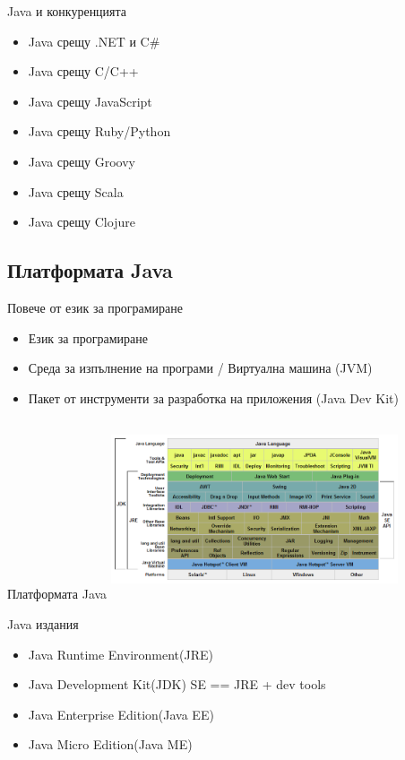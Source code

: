 \documentclass{beamer}
\begin{document}
\begin{frame}{Java и конкуренцията}
  \transdissolve
  \begin{itemize}
    \item Java срещу .NET и C\#
    \item Java срещу C/C++
    \item Java срещу JavaScript
    \item Java срещу Ruby/Python
    \item Java срещу Groovy
    \item Java срещу Scala
    \item Java срещу Clojure
  \end{itemize}
\end{frame}

\subsection{Платформата Java}

\begin{frame}{Повече от език за програмиране}
  \transdissolve
  \begin{itemize}
    \item Език за програмиране
    \item Среда за изпълнение на програми / Виртуална машина (JVM)
    \item Пакет от инструменти за разработка на приложения (Java Dev Kit)
  \end{itemize}

\end{frame}

\begin{frame}{Платформата Java}
  \transdissolve
  \includegraphics[height=200px, width=320px]{images/JavaPlatform.png}
\end{frame}

\begin{frame}{Java издания}
  \transdissolve
  \begin{itemize}
    \item Java Runtime Environment(JRE)
    \item Java Development Kit(JDK) SE == JRE + dev tools
    \item Java Enterprise Edition(Java EE)
    \item Java Micro Edition(Java ME)
  \end{itemize}
\end{frame}
\end{document}
